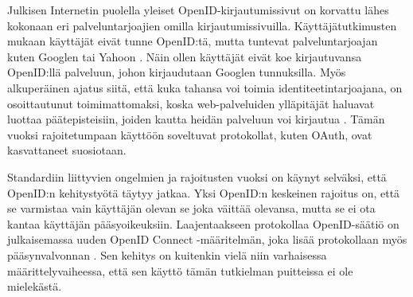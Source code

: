 Julkisen Internetin puolella yleiset OpenID-kir\-jau\-tu\-mis\-si\-vut on korvattu lähes kokonaan eri palveluntarjoajien omilla kirjautumissivuilla. Käyttäjätutkimusten mukaan käyttäjät eivät tunne OpenID:tä, mutta tuntevat palveluntarjoajan kuten Googlen tai Yahoon \cite{refuse_sso}. Näin ollen käyttäjät eivät koe kirjautuvansa OpenID:llä palveluun, johon kirjaudutaan Googlen tunnuksilla. Myös alkuperäinen ajatus siitä, että kuka tahansa voi toimia identiteetintarjoajana, on osoittautunut toimimattomaksi, koska web-palveluiden ylläpitäjät haluavat luottaa päätepisteisiin, joiden kautta heidän palveluun voi kirjautua \cite{refuse_sso}. Tämän vuoksi rajoitetumpaan käyttöön soveltuvat protokollat, kuten OAuth, ovat kasvattaneet suosiotaan.

Standardiin liittyvien ongelmien ja rajoitusten vuoksi on käynyt selväksi, että Open\-ID:n kehitystyötä täytyy jatkaa. Yksi OpenID:n keskeinen rajoitus on, että se varmistaa vain käyttäjän olevan se joka väittää olevansa, mutta se ei ota kantaa käyttäjän pääsyoikeuksiin. Laajentaakseen protokollaa OpenID-säätiö on julkaisemassa uuden OpenID Connect -määritelmän, joka lisää protokollaan myös pääsynvalvonnan \cite{distributed_web_security}. Sen kehitys on kuitenkin vielä niin varhaisessa määrittelyvaiheessa, että sen käyttö tämän tutkielman puitteissa ei ole mielekästä.